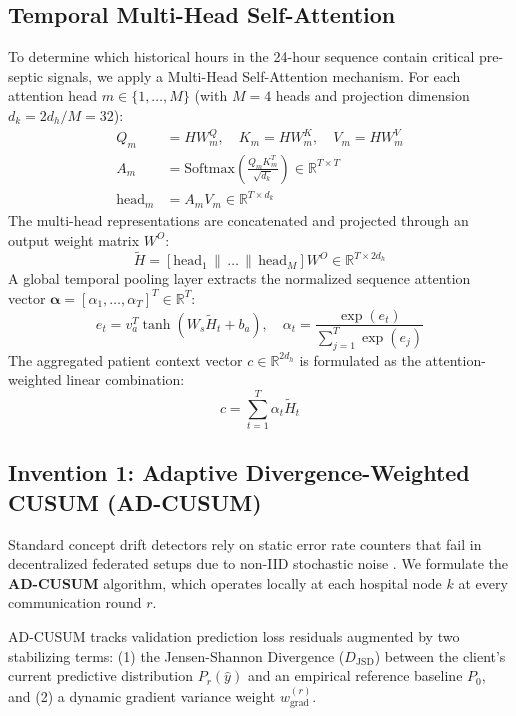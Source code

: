 \documentclass[journal,twocolumn,10pt]{IEEEtran}
\begin{document}
\subsection{Temporal Multi-Head Self-Attention}
To determine which historical hours in the 24-hour sequence contain critical pre-septic signals, we apply a Multi-Head Self-Attention mechanism. For each attention head $m \in \{1, \dots, M\}$ (with $M = 4$ heads and projection dimension $d_k = 2d_h / M = 32$):
\begin{align}
Q_m &= H W_m^Q, \quad K_m = H W_m^K, \quad V_m = H W_m^V \\
A_m &= \text{Softmax}\left(\frac{Q_m K_m^T}{\sqrt{d_k}}\right) \in \mathbb{R}^{T \times T} \\
\text{head}_m &= A_m V_m \in \mathbb{R}^{T \times d_k}
\end{align}
The multi-head representations are concatenated and projected through an output weight matrix $W^O$:
\begin{equation}
\tilde{H} = [\text{head}_1 \,\|\, \dots \,\|\, \text{head}_M] W^O \in \mathbb{R}^{T \times 2d_h}
\end{equation}
A global temporal pooling layer extracts the normalized sequence attention vector $\boldsymbol{\alpha} = [\alpha_1, \dots, \alpha_T]^T \in \mathbb{R}^T$:
\begin{equation}
e_t = v_a^T \tanh(W_s \tilde{H}_t + b_a), \quad \alpha_t = \frac{\exp(e_t)}{\sum_{j=1}^{T} \exp(e_j)}
\end{equation}
The aggregated patient context vector $c \in \mathbb{R}^{2d_h}$ is formulated as the attention-weighted linear combination:
\begin{equation}
c = \sum_{t=1}^{T} \alpha_t \tilde{H}_t
\end{equation}

\subsection{Invention 1: Adaptive Divergence-Weighted CUSUM (AD-CUSUM)}
Standard concept drift detectors rely on static error rate counters that fail in decentralized federated setups due to non-IID stochastic noise \cite{jothimurugesan2022,bernardi2023adaptive}. We formulate the \textbf{AD-CUSUM} algorithm, which operates locally at each hospital node $k$ at every communication round $r$. 

AD-CUSUM tracks validation prediction loss residuals augmented by two stabilizing terms: (1) the Jensen-Shannon Divergence ($D_{\text{JSD}}$) between the client's current predictive distribution $P_r(\hat{y})$ and an empirical reference baseline $P_0$, and (2) a dynamic gradient variance weight $w_{\text{grad}}^{(r)}$.
\end{document}
